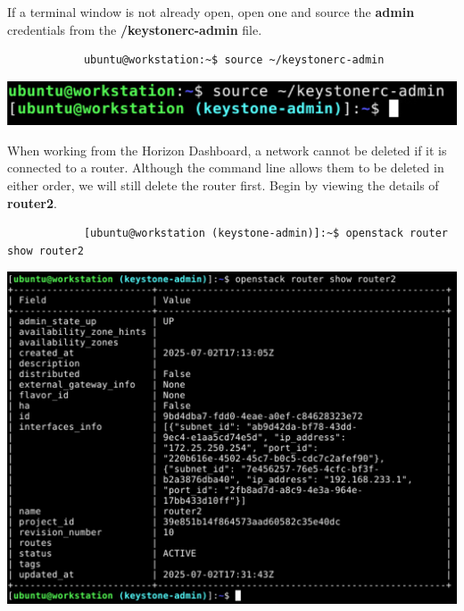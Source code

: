 \documentclass[letterpaper, 12pt]{article}
\begin{document}
\begin{enumerate}
    \begin{labstep}
        If a terminal window is not already open, open one and source the \textbf{admin} credentials from the
        \textbf{\texttildemid/keystonerc-admin} file.
        \begin{lstlisting}
            ubuntu@workstation:~$ source ~/keystonerc-admin
        \end{lstlisting}

        \begin{center}
            \includegraphics[width=\linewidth]{images/part4/step1.png}
        \end{center}
    \end{labstep}

    \begin{labstep}
        When working from the Horizon Dashboard, a network cannot be deleted if it is connected to a router.
        Although the command line allows them to be deleted in either order, we will still delete the router first.
        Begin by viewing the details of \textbf{router2}.
        \begin{lstlisting}
            [ubuntu@workstation (keystone-admin)]:~$ openstack router show router2
        \end{lstlisting}

        \begin{center}
            \includegraphics[scale=0.45]{images/part4/step2.png}
        \end{center}
    \end{labstep}


\end{enumerate}
\end{document}
